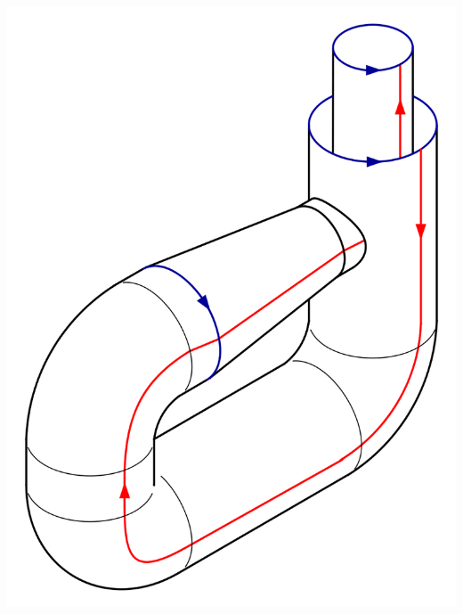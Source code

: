\begin{example}
\begin{enumerate}[1)]
\begin{minipage}{\textwidth}
\begin{minipage}{0.3\textwidth}
                    \includegraphics[width=\textwidth]{figures/800px-Klein_Bottle_Folding_5.svg.png}
                \end{minipage}
                \begin{minipage}{0.3\textwidth}

\end{minipage}
\end{minipage}
\end{enumerate}
\end{example}
